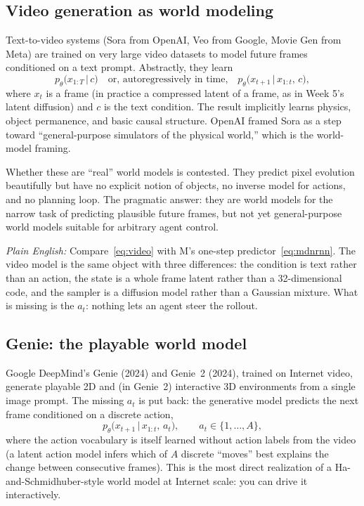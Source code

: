 \documentclass[11pt]{article}
\newcommand{\given}{\,\vert\,}
\theoremstyle{remark}
\newcommand{\plain}[1]{\medskip\noindent\textit{Plain English:} #1\medskip}
\begin{document}
\subsection{Video generation as world modeling}

Text-to-video systems (Sora from OpenAI, Veo from Google, Movie Gen from Meta) are trained on very large video datasets to model future frames conditioned on a text prompt. Abstractly, they learn
\begin{equation}
  p_\theta\big(x_{1:T} \given c\big) \quad\text{or, autoregressively in time,}\quad p_\theta\big(x_{t+1} \given x_{1:t},\, c\big),
  \label{eq:video}
\end{equation}
where $x_t$ is a frame (in practice a compressed latent of a frame, as in Week 5's latent diffusion) and $c$ is the text condition. The result implicitly learns physics, object permanence, and basic causal structure. OpenAI framed Sora as a step toward ``general-purpose simulators of the physical world,'' which is the world-model framing.

Whether these are ``real'' world models is contested. They predict pixel evolution beautifully but have no explicit notion of objects, no inverse model for actions, and no planning loop. The pragmatic answer: they are world models for the narrow task of predicting plausible future frames, but not yet general-purpose world models suitable for arbitrary agent control.

\plain{Compare~\eqref{eq:video} with M's one-step predictor~\eqref{eq:mdnrnn}. The video model is the same object with three differences: the condition is text rather than an action, the state is a whole frame latent rather than a 32-dimensional code, and the sampler is a diffusion model rather than a Gaussian mixture. What is missing is the $a_t$: nothing lets an agent steer the rollout.}

\subsection{Genie: the playable world model}

Google DeepMind's Genie (2024) and Genie~2 (2024), trained on Internet video, generate playable 2D and (in Genie~2) interactive 3D environments from a single image prompt. The missing $a_t$ is put back: the generative model predicts the next frame conditioned on a discrete action,
\begin{equation}
  p_\theta\big(x_{t+1} \given x_{1:t},\, a_t\big), \qquad a_t \in \{1, \dots, A\},
  \label{eq:genie}
\end{equation}
where the action vocabulary is itself learned without action labels from the video (a latent action model infers which of $A$ discrete ``moves'' best explains the change between consecutive frames). This is the most direct realization of a Ha-and-Schmidhuber-style world model at Internet scale: you can drive it interactively.
\end{document}
